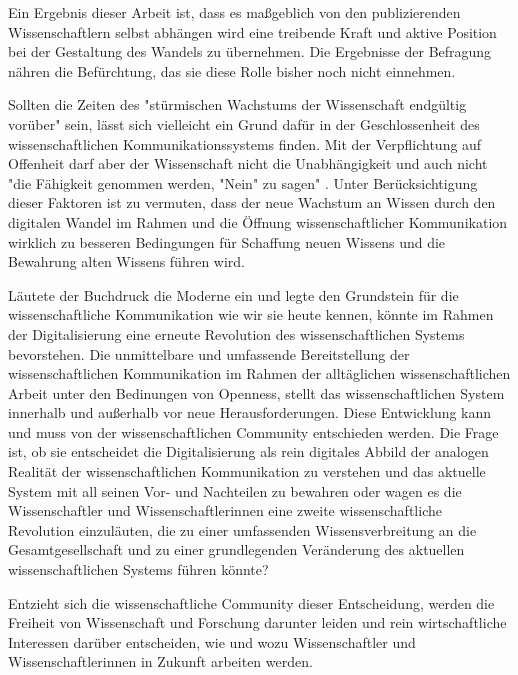 Ein Ergebnis dieser Arbeit ist, dass es maßgeblich von den publizierenden Wissenschaftlern selbst abhängen wird eine treibende Kraft und aktive Position bei der Gestaltung des Wandels zu übernehmen. Die Ergebnisse der Befragung nähren die Befürchtung, das sie diese Rolle bisher noch nicht einnehmen.

Sollten die Zeiten des "stürmischen Wachstums der Wissenschaft endgültig vorüber" \cite{K_lbel_2002} sein, lässt sich vielleicht ein Grund dafür in der Geschlossenheit des wissenschaftlichen Kommunikationssystems finden. Mit der Verpflichtung auf Offenheit darf aber der Wissenschaft nicht die Unabhängigkeit und auch nicht "die Fähigkeit genommen werden, "Nein" zu sagen" \cite{suchen_Hornbostel_2006}. Unter Berücksichtigung dieser Faktoren ist zu vermuten, dass der neue Wachstum an Wissen durch den digitalen Wandel im Rahmen und die Öffnung wissenschaftlicher Kommunikation wirklich zu besseren Bedingungen für Schaffung neuen Wissens und die Bewahrung alten Wissens führen wird.

Läutete der Buchdruck die Moderne ein und legte den Grundstein für die wissenschaftliche Kommunikation wie wir sie heute kennen, könnte im Rahmen der Digitalisierung eine erneute Revolution des wissenschaftlichen Systems bevorstehen. Die unmittelbare und umfassende Bereitstellung der wissenschaftlichen Kommunikation im Rahmen der alltäglichen wissenschaftlichen Arbeit unter den Bedinungen von Openness, stellt das wissenschaftlichen System innerhalb und außerhalb vor neue Herausforderungen.
Diese Entwicklung kann und muss von der wissenschaftlichen Community entschieden werden. Die Frage ist, ob sie entscheidet die Digitalisierung als rein digitales Abbild der analogen Realität der wissenschaftlichen Kommunikation zu verstehen und das aktuelle System mit all seinen Vor- und Nachteilen zu bewahren oder wagen es die Wissenschaftler und Wissenschaftlerinnen eine zweite wissenschaftliche Revolution einzuläuten, die zu einer umfassenden Wissensverbreitung an die Gesamtgesellschaft und zu einer grundlegenden Veränderung des aktuellen wissenschaftlichen Systems führen könnte?

Entzieht sich die wissenschaftliche Community dieser Entscheidung, werden die Freiheit von Wissenschaft und Forschung darunter leiden und rein wirtschaftliche Interessen darüber entscheiden, wie und wozu Wissenschaftler und Wissenschaftlerinnen in Zukunft arbeiten werden.
